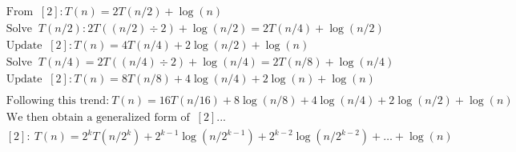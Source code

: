 \begin{align*}
& \text{From } \ [2]: T(n) = 2T(n/2) + \log(n) \\
& \text{Solve } \ T(n/2): 2T((n/2) \div 2) + \log(n/2) = 2T(n/4) + \log(n/2) \\
& \text{Update } \ [2]: T(n) = 4T(n/4) + 2\log(n/2) + \log(n) \\
& \text{Solve } \ T(n/4) = 2T((n/4) \div 2) + \log(n/4) = 2T(n/8) + \log(n/4) \\
& \text{Update } \ [2]: T(n) = 8T(n/8) + 4\log(n/4) + 2\log(n) + \log(n) \\
\\
& \text{Following this trend:} \ T(n) = 16T(n/16) + 8\log(n/8) + 4\log(n/4) + 2\log(n/2) + \log(n) \\
& \text{We then obtain a generalized form of } \ [2]... \\
& [2]: \ T(n) = 2^kT(n/2^k) + 2^{k-1}\log(n/2^{k-1}) + 2^{k-2}\log(n/2^{k-2}) + \ldots + \log(n)
\end{align*}
